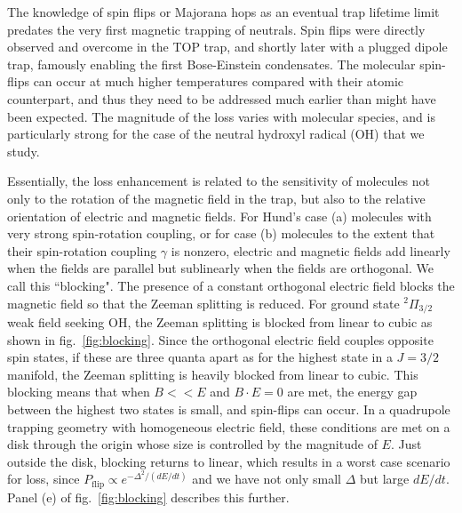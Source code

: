 \documentclass[%
 reprint,
 amsmath,amssymb,
 aps,
prl,
]{revtex4-1}
\begin{document}
The knowledge of spin flips or Majorana hops as an eventual trap lifetime limit predates the very first magnetic trapping of neutrals\cite{Migdall1985}. Spin flips were directly observed and overcome in the TOP trap\cite{Petrich1995}, and shortly later with a plugged dipole trap\cite{Davis1995}, famously enabling the first Bose-Einstein condensates. The molecular spin-flips can occur at much higher temperatures compared with their atomic counterpart, and thus they need to be addressed much earlier than might have been expected. The magnitude of the loss varies with molecular species, and is particularly strong for the case of the neutral hydroxyl radical (OH) that we study. 

Essentially, the loss enhancement is related to the sensitivity of molecules not only to the rotation of the magnetic field in the trap, but also to the relative orientation of electric and magnetic fields. For Hund's case (a) molecules with very strong spin-rotation coupling, or for case (b) molecules to the extent that their spin-rotation coupling $\gamma$ is nonzero, electric and magnetic fields add linearly when the fields are parallel but sublinearly when the fields are orthogonal. We call this ``blocking". The presence of a constant orthogonal electric field blocks the magnetic field so that the Zeeman splitting is reduced. For ground state $^2\Pi_{3/2}$ weak field seeking OH, the Zeeman splitting is blocked from linear to cubic as shown in fig.~\ref{fig:blocking}. Since the orthogonal electric field couples opposite spin states, if these are three quanta apart as for the highest state in a $J=3/2$ manifold, the Zeeman splitting is heavily blocked from linear to cubic. This blocking means that when $B<<E$ and $B\cdot E=0$ are met, the energy gap between the highest two states is small, and spin-flips can occur. In a quadrupole trapping geometry with homogeneous electric field, these conditions are met on a disk  through the origin whose size is controlled by the magnitude of $E$. Just outside the disk, blocking returns to linear, which results in a worst case scenario for loss, since $P_{\text{flip}}\propto e^{-\Delta^2/(dE/dt)}$ and we have not only small $\Delta$ but large $dE/dt$. Panel (e) of fig.~\ref{fig:blocking} describes this further.
\end{document}
